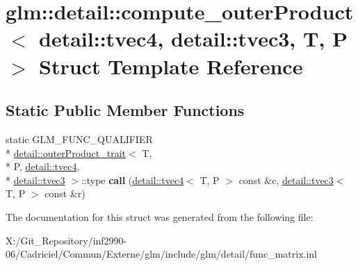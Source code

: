 \hypertarget{structglm_1_1detail_1_1compute__outer_product_3_01detail_1_1tvec4_00_01detail_1_1tvec3_00_01_t_00_01_p_01_4}{\section{glm\-:\-:detail\-:\-:compute\-\_\-outer\-Product$<$ detail\-:\-:tvec4, detail\-:\-:tvec3, T, P $>$ Struct Template Reference}
\label{structglm_1_1detail_1_1compute__outer_product_3_01detail_1_1tvec4_00_01detail_1_1tvec3_00_01_t_00_01_p_01_4}
}
\subsection*{Static Public Member Functions}
\begin{DoxyCompactItemize}
\item 
\hypertarget{structglm_1_1detail_1_1compute__outer_product_3_01detail_1_1tvec4_00_01detail_1_1tvec3_00_01_t_00_01_p_01_4_a7e5367e91d2b8d7863f6e5b277317c45}{static G\-L\-M\-\_\-\-F\-U\-N\-C\-\_\-\-Q\-U\-A\-L\-I\-F\-I\-E\-R \\*
\hyperlink{structglm_1_1detail_1_1outer_product__trait}{detail\-::outer\-Product\-\_\-trait}$<$ T, \\*
P, \hyperlink{structglm_1_1detail_1_1tvec4}{detail\-::tvec4}, \\*
\hyperlink{structglm_1_1detail_1_1tvec3}{detail\-::tvec3} $>$\-::type {\bfseries call} (\hyperlink{structglm_1_1detail_1_1tvec4}{detail\-::tvec4}$<$ T, P $>$ const \&c, \hyperlink{structglm_1_1detail_1_1tvec3}{detail\-::tvec3}$<$ T, P $>$ const \&r)}\label{structglm_1_1detail_1_1compute__outer_product_3_01detail_1_1tvec4_00_01detail_1_1tvec3_00_01_t_00_01_p_01_4_a7e5367e91d2b8d7863f6e5b277317c45}

\end{DoxyCompactItemize}


The documentation for this struct was generated from the following file\-:\begin{DoxyCompactItemize}
\item 
X\-:/\-Git\-\_\-\-Repository/inf2990-\/06/\-Cadriciel/\-Commun/\-Externe/glm/include/glm/detail/func\-\_\-matrix.\-inl\end{DoxyCompactItemize}
